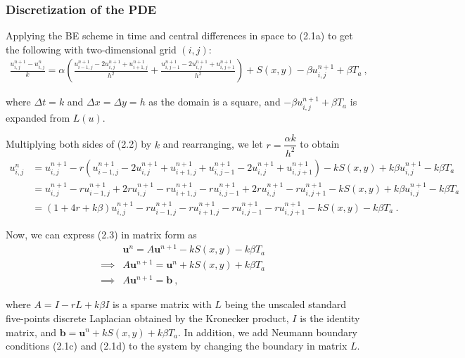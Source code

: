 \documentclass{article}
\begin{document}
\subsubsection*{Discretization of the PDE}
\noindent Applying the BE scheme in time and central differences in space to (2.1a) to get the following with two-dimensional grid $(i, j)$: 
\begin{align*}
    \frac{u^{n+1}_{i, j} - u^{n}_{i,j}}{k} = \alpha \left( \frac{u^{n+1}_{i-1, j} - 2u^{n+1}_{i, j} + u^{n+1}_{i+1, j}}{h^2} + \frac{u^{n+1}_{i, j-1} - 2u^{n+1}_{i, j} + u^{n+1}_{i, j+1}}{h^2} \right) + S(x, y) - \beta u^{n+1}_{i, j} + \beta T_a \ , \tag{2.2}
\end{align*}

\noindent where $\Delta t = k$ and $\Delta x = \Delta y = h$ as the domain is a square, and $- \beta u^{n+1}_{i, j} + \beta T_a$ is expanded from $L(u)$.

\vspace{3mm}

\noindent Multiplying both sides of (2.2) by $k$ and rearranging, we let $r = \dfrac{\alpha k}{h^2}$ to obtain 
\begin{align*}
    u^n_{i, j} &= u^{n+1}_{i, j} - r \left( u^{n+1}_{i-1, j} - 2u^{n+1}_{i, j} + u^{n+1}_{i+1, j} + u^{n+1}_{i, j-1} - 2u^{n+1}_{i, j} + u^{n+1}_{i, j+1} \right) - kS(x, y) + k\beta u^{n+1}_{i, j} - k\beta T_a \\ 
    &= u^{n+1}_{i, j} - ru^{n+1}_{i-1, j} + 2ru^{n+1}_{i, j} -r u^{n+1}_{i+1, j} -r u^{n+1}_{i, j-1} +2ru^{n+1}_{i, j} -r u^{n+1}_{i, j+1} - kS(x, y) + k\beta u^{n+1}_{i, j} - k\beta T_a \\
    &= (1 + 4r + k\beta) u^{n+1}_{i, j} - r u^{n+1}_{i-1, j} - r u^{n+1}_{i+1, j} - r u^{n+1}_{i, j-1} - r u^{n+1}_{i, j+1} - kS(x, y) - k\beta T_a \ . \tag{2.3}
\end{align*}

\noindent Now, we can express (2.3) in matrix form as
\begin{align*}
    & \textbf{u}^n = A \textbf{u}^{n+1} - kS(x, y) - k\beta T_a  \\
    \implies & A \textbf{u}^{n+1} =\textbf{u}^n + kS(x, y) + k\beta T_a \\
    \implies & A \textbf{u}^{n+1} = \textbf{b} \ , \tag{2.4}
\end{align*}

\noindent where $A = I - r L + k\beta I$ is a sparse matrix with $L$ being the unscaled standard five-points discrete Laplacian obtained by the Kronecker product, $I$ is the identity matrix, and $\textbf{b} = \textbf{u}^n + kS(x, y) + k\beta T_a$. In addition, we add Neumann boundary conditions (2.1c) and (2.1d) to the system by changing the boundary in matrix $L$.
\end{document}
